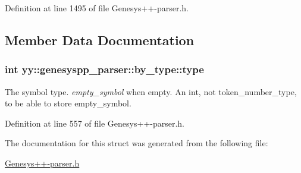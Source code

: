 Definition at line 1495 of file Genesys++-\/parser.\-h.



\subsection{Member Data Documentation}
\hypertarget{structyy_1_1genesyspp__parser_1_1by__type_a3ab3fb8851f9a2bc0b7703ad54b9bb19}{
\subsubsection[{type}]{\setlength{\rightskip}{0pt plus 5cm}int yy\-::genesyspp\-\_\-parser\-::by\-\_\-type\-::type}}\label{structyy_1_1genesyspp__parser_1_1by__type_a3ab3fb8851f9a2bc0b7703ad54b9bb19}
The symbol type. {\itshape empty\-\_\-symbol} when empty. An int, not token\-\_\-number\-\_\-type, to be able to store empty\-\_\-symbol. 

Definition at line 557 of file Genesys++-\/parser.\-h.



The documentation for this struct was generated from the following file\-:\begin{DoxyCompactItemize}
\item 
\hyperlink{_genesys_09_09-parser_8h}{Genesys++-\/parser.\-h}\end{DoxyCompactItemize}
